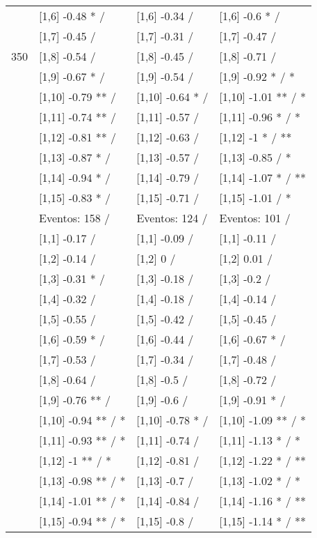 \begin{table}
\begin{tabular}[t]{llll}
 & {}[1,6] -0.48 * / & {}[1,6] -0.34  / & {}[1,6] -0.6 * /\\
 & {}[1,7] -0.45  / & {}[1,7] -0.31  / & {}[1,7] -0.47  /\\
350 & {}[1,8] -0.54  / & {}[1,8] -0.45  / & {}[1,8] -0.71  /\\
\addlinespace
 & {}[1,9] -0.67 * / & {}[1,9] -0.54  / & {}[1,9] -0.92 * / *\\
 & {}[1,10] -0.79 ** / & {}[1,10] -0.64 * / & {}[1,10] -1.01 ** / *\\
 & {}[1,11] -0.74 ** / & {}[1,11] -0.57  / & {}[1,11] -0.96 * / *\\
 & {}[1,12] -0.81 ** / & {}[1,12] -0.63  / & {}[1,12] -1 * / **\\
 & {}[1,13] -0.87 * / & {}[1,13] -0.57  / & {}[1,13] -0.85  / *\\
\addlinespace
 & {}[1,14] -0.94 * / & {}[1,14] -0.79  / & {}[1,14] -1.07 * / **\\
 & {}[1,15] -0.83 * / & {}[1,15] -0.71  / & {}[1,15] -1.01  / *\\
 & Eventos:  158 / & Eventos:  124 / & Eventos:  101 /\\
 & {}[1,1] -0.17  / & {}[1,1] -0.09  / & {}[1,1] -0.11  /\\
 & {}[1,2] -0.14  / & {}[1,2] 0  / & {}[1,2] 0.01  /\\
\addlinespace
 & {}[1,3] -0.31 * / & {}[1,3] -0.18  / & {}[1,3] -0.2  /\\
 & {}[1,4] -0.32  / & {}[1,4] -0.18  / & {}[1,4] -0.14  /\\
 & {}[1,5] -0.55  / & {}[1,5] -0.42  / & {}[1,5] -0.45  /\\
 & {}[1,6] -0.59 * / & {}[1,6] -0.44  / & {}[1,6] -0.67 * /\\
 & {}[1,7] -0.53  / & {}[1,7] -0.34  / & {}[1,7] -0.48  /\\
\addlinespace
500 & {}[1,8] -0.64  / & {}[1,8] -0.5  / & {}[1,8] -0.72  /\\
 & {}[1,9] -0.76 ** / & {}[1,9] -0.6  / & {}[1,9] -0.91 * /\\
 & {}[1,10] -0.94 ** / * & {}[1,10] -0.78 * / & {}[1,10] -1.09 ** / *\\
 & {}[1,11] -0.93 ** / * & {}[1,11] -0.74  / & {}[1,11] -1.13 * / *\\
 & {}[1,12] -1 ** / * & {}[1,12] -0.81  / & {}[1,12] -1.22 * / **\\
\addlinespace
 & {}[1,13] -0.98 ** / * & {}[1,13] -0.7  / & {}[1,13] -1.02 * / *\\
 & {}[1,14] -1.01 ** / * & {}[1,14] -0.84  / & {}[1,14] -1.16 * / **\\
 & {}[1,15] -0.94 ** / * & {}[1,15] -0.8  / & {}[1,15] -1.14 * / **\\
\bottomrule
\end{tabular}
\end{table}
